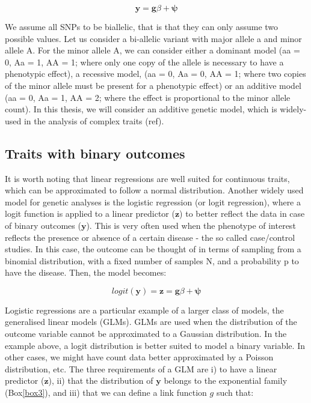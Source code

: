 \begin{equation}\label{eq:Linear_regression_genetics}
 \mathbf{y} = \mathbf{g}\beta + \boldsymbol{\psi} 
\end{equation}

We assume all SNPs to be biallelic, that is that they can only assume two possible values. 
Let us consider a bi-allelic variant with major allele a and minor allele A. For the minor allele A, we can consider either a dominant model (aa = 0, Aa = 1, AA = 1; where only one copy of the allele is necessary to have a phenotypic effect), a recessive model, (aa = 0, Aa = 0, AA = 1; where two copies of the minor allele must be present for a phenotypic effect) or an additive model (aa = 0, Aa = 1, AA = 2; where the effect is proportional to the minor allele count). 
In this thesis, we will consider an additive genetic model, which is widely-used in the analysis of complex traits (ref).

\subsection{Traits with binary outcomes}

It is worth noting that linear regressions are well suited for continuous traits, which can be approximated to follow a normal distribution. 
Another widely used model for genetic analyses is the logistic regression (or logit regression), where a logit function is applied to a linear predictor ($\mathbf{z}$) to better reflect the data in case of binary outcomes ($\mathbf{y}$). 
This is very often used when the phenotype of interest reflects the presence or absence of a certain disease - the so called case/control studies.
In this case, the outcome can be thought of in terms of sampling from a binomial distribution, with a fixed number of samples N, and a probability p to have the disease. Then, the model becomes:

\begin{equation}\label{eq:Logistic_regression_genetics_z}
 logit(\mathbf{y}) = \mathbf{z} = \mathbf{g}\beta + \boldsymbol{\psi} 
\end{equation}

Logistic regressions are a particular example of a larger class of models, the generalised linear models (GLMs). 
GLMs are used when the distribution of the outcome variable cannot be approximated to a Gaussian distribution. 
In the example above, a logit distribution is better suited to model a binary variable. 
In other cases, we might have count data better approximated by a Poisson distribution, etc.
The three requirements of a GLM are i) to have a linear predictor ($\mathbf{z}$), ii) that the distribution of $\mathbf{y}$  belongs to the exponential family (Box\ref{box3}), and iii) that we can define a link function $g$ such that:

